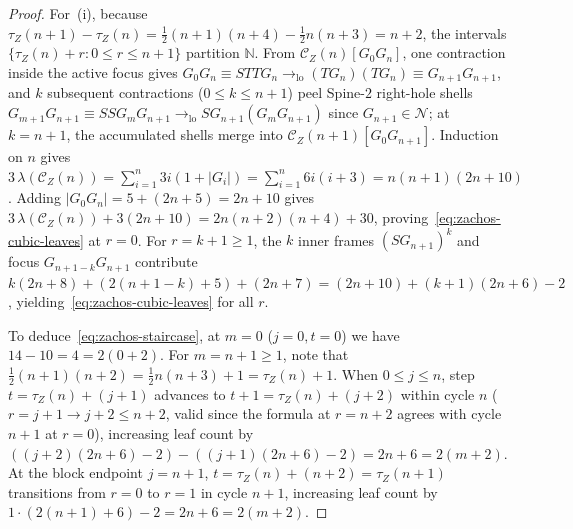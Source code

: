 \documentclass[11pt,reqno]{amsart}
\numberwithin{equation}{section}
\theoremstyle{plain}
\theoremstyle{definition}
\theoremstyle{remark}
\begin{document}
\begin{proof}
For~(i), because $\tau_Z(n+1) - \tau_Z(n) = \frac{1}{2}(n+1)(n+4) - \frac{1}{2}n(n+3) = n + 2$, the intervals $\{\tau_Z(n) + r : 0 \le r \le n + 1\}$ partition $\mathbb{N}$. From $\mathcal{C}_Z(n)[G_0 G_n]$, one contraction inside the active focus gives $G_0 G_n \equiv S T T G_n \to_{\mathrm{lo}} (T G_n)(T G_n) \equiv G_{n+1} G_{n+1}$, and $k$ subsequent contractions ($0 \le k \le n + 1$) peel Spine-$2$ right-hole shells $G_{m+1} G_{n+1} \equiv S S G_m G_{n+1} \to_{\mathrm{lo}} S G_{n+1} (G_m G_{n+1})$ since $G_{n+1} \in \mathcal{N}$; at $k = n + 1$, the accumulated shells merge into $\mathcal{C}_Z(n+1)[G_0 G_{n+1}]$. Induction on $n$ gives $3\,\lambda(\mathcal{C}_Z(n)) = \sum_{i=1}^n 3i(1 + |G_i|) = \sum_{i=1}^n 6i(i + 3) = n(n+1)(2n+10)$. Adding $|G_0 G_n| = 5 + (2n + 5) = 2n + 10$ gives $3\,\lambda(\mathcal{C}_Z(n)) + 3(2n + 10) = 2n(n+2)(n+4) + 30$, proving~\eqref{eq:zachos-cubic-leaves} at $r = 0$. For $r = k + 1 \ge 1$, the $k$ inner frames $(S G_{n+1})^k$ and focus $G_{n+1-k} G_{n+1}$ contribute $k(2n + 8) + (2(n + 1 - k) + 5) + (2n + 7) = (2n + 10) + (k + 1)(2n + 6) - 2$, yielding~\eqref{eq:zachos-cubic-leaves} for all $r$.

To deduce~\eqref{eq:zachos-staircase}, at $m = 0$ ($j = 0, t = 0$) we have $14 - 10 = 4 = 2(0 + 2)$. For $m = n + 1 \ge 1$, note that $\frac{1}{2}(n+1)(n+2) = \frac{1}{2}n(n+3) + 1 = \tau_Z(n) + 1$. When $0 \le j \le n$, step $t = \tau_Z(n) + (j + 1)$ advances to $t + 1 = \tau_Z(n) + (j + 2)$ within cycle $n$ ($r = j + 1 \to j + 2 \le n + 2$, valid since the formula at $r = n + 2$ agrees with cycle $n + 1$ at $r = 0$), increasing leaf count by $((j + 2)(2n + 6) - 2) - ((j + 1)(2n + 6) - 2) = 2n + 6 = 2(m + 2)$. At the block endpoint $j = n + 1$, $t = \tau_Z(n) + (n + 2) = \tau_Z(n + 1)$ transitions from $r = 0$ to $r = 1$ in cycle $n + 1$, increasing leaf count by $1 \cdot (2(n + 1) + 6) - 2 = 2n + 6 = 2(m + 2)$.


\end{proof}
\end{document}
